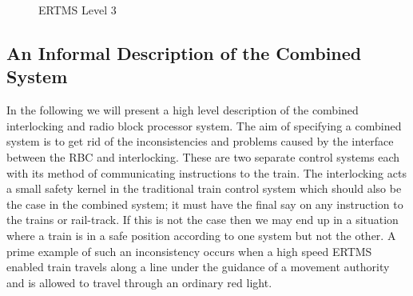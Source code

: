 \begin{center}
\begin{figure}[h!]



 \caption{ERTMS Level 3}
\label{fig:ERTMSLevel3}
\end{figure}
\end{center}






\subsection*{An Informal Description of the Combined System}
In the following we will present a high level description of the combined interlocking and radio block processor system. The aim of specifying a combined system is to get rid of the inconsistencies and problems caused by the interface between the RBC and interlocking.  These are two separate control systems each with its method of communicating instructions to the train. The interlocking acts a small safety kernel in the traditional train control system which should also be the case in the combined system; it must have the final say on any instruction to the trains or rail-track. If this is not the case then we may end up in a situation where a train is in a safe position according to one system but not the other. A prime example of such an inconsistency occurs when a high speed ERTMS enabled train travels along a line under the guidance of a movement authority and is allowed to travel through an ordinary red light.  




